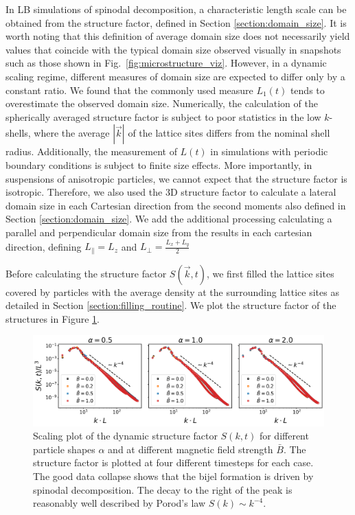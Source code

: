 In LB simulations of spinodal decomposition, a characteristic length
scale can be obtained from the structure factor, defined in Section \ref{section:domain_size}. \cite{kendon_3d_1999,kendon_inertial_2001} 
It is worth noting that this definition of average domain size does not necessarily yield values that coincide with the typical
domain size observed visually in snapshots such as those shown in Fig.~\ref{fig:microstructure_viz}. However, in a dynamic
scaling regime, different measures of domain size are expected to differ only by a constant ratio. We found that the commonly 
used measure \(L_1(t)\) tends to overestimate the observed domain size. Numerically, the calculation of the spherically 
averaged structure factor is subject to poor statistics in the low \(k\)-shells, where the average \(|\vec{k}|\) of the 
lattice sites differs from the nominal shell radius. Additionally, the measurement of \(L(t)\) in simulations with
periodic boundary conditions is subject to finite size effects. More importantly, in suspensions of anisotropic particles, 
we cannot expect that the structure factor is isotropic. Therefore, we also used the 3D structure factor to calculate a lateral domain 
size in each Cartesian direction from the second moments also defined in Section \ref{section:domain_size}. 
\cite{jansen_bijels_2011,gunther_timescales_2014} We add the additional processing calculating a parallel and perpendicular domain size
from the results in each cartesian direction, defining $L_{\parallel}=L_z$ and $L_{\perp} = \frac{L_x+L_y}{2}$

Before calculating the structure factor \(S(\vec{k},t)\), we first filled the lattice sites covered by particles with the average
density at the surrounding lattice sites as detailed in Section \ref{section:filling_routine}. We plot the structure factor of the structures in
Figure \ref{fig:structure_factor}.

\begin{figure}
    \centering
    \includegraphics[width=\textwidth]{figures/results/paper1/structure_factor.png}
    \caption{Scaling plot of the dynamic structure factor $S(k,t)$ for different particle shapes $\alpha$ and at different 
            magnetic field strength $\bar{B}$. The structure factor is plotted at four different timesteps for each case. The good data collapse shows that the bijel formation is driven by spinodal decomposition. The decay to the right of the peak is reasonably well described by Porod's law $S(k)\sim k^{-4}$.}
    \label{fig:structure_factor}
\end{figure}

